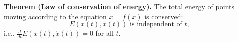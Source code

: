 \textbf{Theorem (Law of conservation of energy).}
The total energy of points moving according to the equation $\ddot{x} = f(x)$ is conserved:
$$E(x(t), \dot{x}(t)) \text{ is independent of } t,$$
i.e., $\frac{d}{dt}E(x(t), \dot{x}(t)) = 0$ for all $t$.
